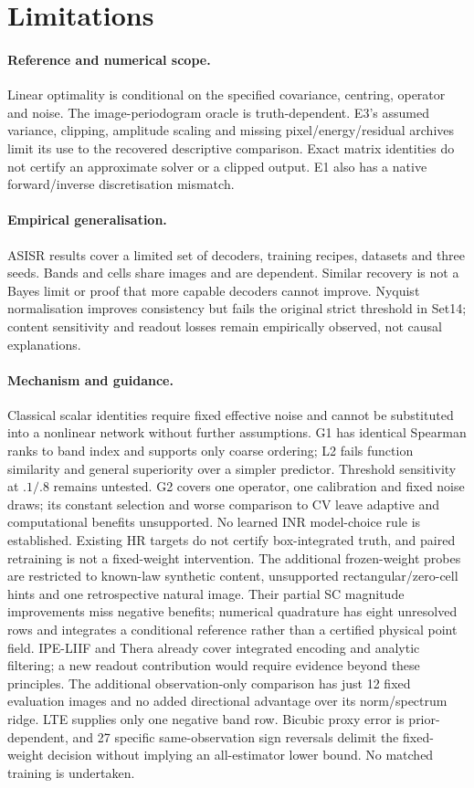 \section{Limitations}\label{sec:limits}
\paragraph{Reference and numerical scope.} Linear optimality is conditional on the specified covariance, centring, operator and noise. The image-periodogram oracle is truth-dependent. E3's assumed variance, clipping, amplitude scaling and missing pixel/energy/residual archives limit its use to the recovered descriptive comparison. Exact matrix identities do not certify an approximate solver or a clipped output. E1 also has a native forward/inverse discretisation mismatch.

\paragraph{Empirical generalisation.} ASISR results cover a limited set of decoders, training recipes, datasets and three seeds. Bands and cells share images and are dependent. Similar recovery is not a Bayes limit or proof that more capable decoders cannot improve. Nyquist normalisation improves consistency but fails the original strict threshold in Set14; content sensitivity and readout losses remain empirically observed, not causal explanations.

\paragraph{Mechanism and guidance.} Classical scalar identities require fixed effective noise and cannot be substituted into a nonlinear network without further assumptions. G1 has identical Spearman ranks to band index and supports only coarse ordering; L2 fails function similarity and general superiority over a simpler predictor. Threshold sensitivity at $.1/.8$ remains untested. G2 covers one operator, one calibration and fixed noise draws; its constant selection and worse comparison to CV leave adaptive and computational benefits unsupported. No learned INR model-choice rule is established. Existing HR targets do not certify box-integrated truth, and paired retraining is not a fixed-weight intervention. The additional frozen-weight probes are restricted to known-law synthetic content, unsupported rectangular/zero-cell hints and one retrospective natural image. Their partial SC magnitude improvements miss negative benefits; numerical quadrature has eight unresolved rows and integrates a conditional reference rather than a certified physical point field. IPE-LIIF and Thera already cover integrated encoding and analytic filtering; a new readout contribution would require evidence beyond these principles. The additional observation-only comparison has just 12 fixed evaluation images and no added directional advantage over its norm/spectrum ridge. LTE supplies only one negative band row. Bicubic proxy error is prior-dependent, and 27 specific same-observation sign reversals delimit the fixed-weight decision without implying an all-estimator lower bound. No matched training is undertaken.

